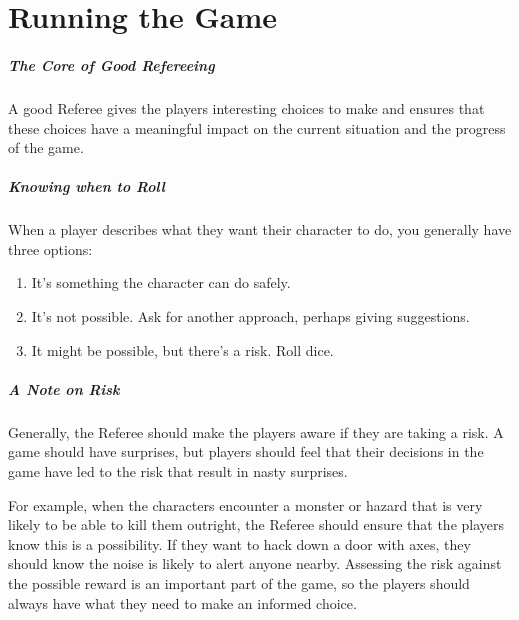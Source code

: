 \documentclass[itdr]{subfiles}
\begin{document}

\chapter{Running the Game}
\label{ch:running_the_game}

\vspace{-0.85em}
\paragraph{The Core of Good Refereeing}
A good Referee gives the players interesting choices to make and ensures that these choices have a meaningful impact on the current situation and the progress of the game.

\vfill

\paragraph{Knowing when to Roll}
When a player describes what they want their character to do, you generally
have three options:
\begin{enumerate}
	\item It's something the character can do safely.
	\item It's not possible. Ask for another approach, \mbox{perhaps} giving suggestions.
	\item It might be possible, but there's a risk. Roll dice.
\end{enumerate}

\vfill

\paragraph{A Note on Risk}
Generally, the Referee should make the players aware if they are taking a risk. A game should have surprises, but players should feel that their decisions in the game have led to the risk that result in nasty surprises.

For example, when the characters encounter a monster or hazard that is very likely to be able to kill them outright, the Referee should ensure that the players know this is a possibility. If they want to hack down a door with axes, they should know the noise is likely to alert anyone nearby. Assessing the risk against the possible reward is an important part of the game, so the players should always have what they need to make an informed choice.
\end{document}
